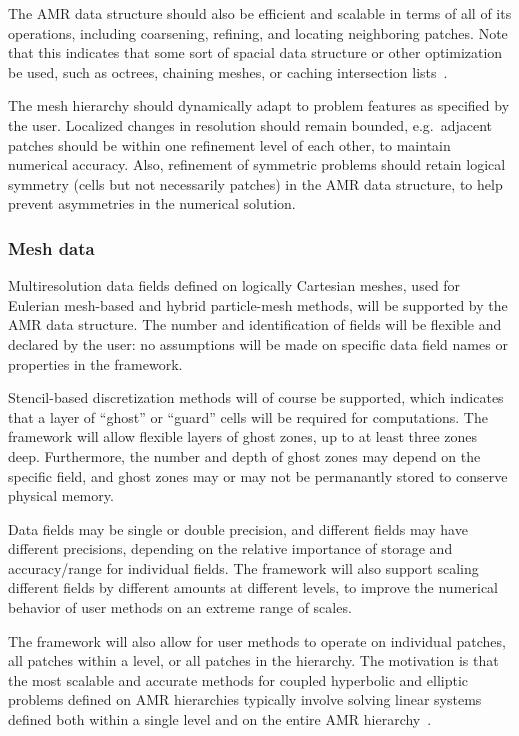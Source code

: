 \documentclass[10pt,twocolumn]{article}
\begin{document}
The AMR data structure should also be efficient and scalable in terms
of all of its operations, including coarsening, refining, and locating
neighboring patches.  Note that this indicates that some sort of
spacial data structure or other optimization be used, such as octrees,
chaining meshes, or caching intersection lists~\cite{StSh09}.

The mesh hierarchy should dynamically adapt to problem features as
specified by the user.  Localized changes in resolution should remain
bounded, e.g.~adjacent patches should be within one refinement
level of each other, to maintain numerical accuracy.  Also, refinement
of symmetric problems should retain logical symmetry (cells but not
necessarily patches) in the AMR data structure, to help prevent
asymmetries in the numerical solution.


\subsubsection{Mesh data} \label{sss:require-fields}

Multiresolution data fields defined on logically Cartesian meshes,
used for Eulerian mesh-based and hybrid particle-mesh methods, will be
supported by the AMR data structure.  The number and identification of
fields will be flexible and declared by the user: no assumptions will
be made on specific data field names or properties in the framework.

Stencil-based discretization methods will of course be supported,
which indicates that a layer of ``ghost'' or ``guard'' cells will be
required for computations.  The framework will allow flexible layers
of ghost zones, up to at least three zones deep.  Furthermore, the
number and depth of ghost zones may depend on the specific field, and
ghost zones may or may not be permanantly stored to conserve physical
memory.

Data fields may be single or double precision, and different fields
may have different precisions, depending on the relative importance of
storage and accuracy/range for individual fields.  The framework will
also support scaling different fields by different amounts at
different levels, to improve the numerical behavior of user methods on
an extreme range of scales.

The framework will also allow for user methods to operate on
individual patches, all patches within a level, or all patches in the
hierarchy.  The motivation is that the most scalable and accurate
methods for coupled hyperbolic and elliptic problems defined on AMR
hierarchies typically involve solving linear systems defined both
within a single level and on the entire AMR hierarchy~\cite{MiCo07}.
\end{document}
